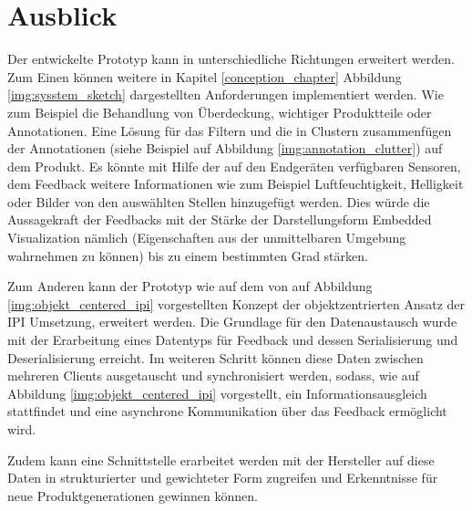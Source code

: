 \section{Ausblick}

Der entwickelte Prototyp kann in unterschiedliche Richtungen erweitert werden. Zum Einen können weitere in Kapitel \ref{conception_chapter} Abbildung \ref{img:sysstem_sketch} dargestellten Anforderungen implementiert 
werden. Wie zum Beispiel die Behandlung von Überdeckung, wichtiger Produktteile oder Annotationen. Eine Lösung für das Filtern und die in Clustern zusammenfügen der Annotationen (siehe Beispiel auf Abbildung \ref{img:annotation_clutter}) auf dem Produkt. Es könnte mit Hilfe der auf den Endgeräten verfügbaren Sensoren, dem Feedback weitere Informationen wie zum Beispiel Luftfeuchtigkeit, Helligkeit oder Bilder von den auswählten Stellen hinzugefügt werden. Dies würde die Aussagekraft der Feedbacks mit der Stärke der Darstellungsform Embedded Visualization nämlich (Eigenschaften aus der unmittelbaren Umgebung wahrnehmen zu können) bis zu einem bestimmten Grad stärken. 

Zum Anderen kann der Prototyp wie auf dem von \citeauthor{Kirschner2012} auf Abbildung \ref{img:objekt_centered_ipi} vorgestellten Konzept der objektzentrierten Ansatz der IPI Umsetzung, erweitert werden.
Die Grundlage für den Datenaustausch wurde mit der Erarbeitung eines Datentyps für Feedback und dessen Serialisierung und Deserialisierung erreicht. Im weiteren Schritt können diese Daten zwischen mehreren
Clients ausgetauscht und synchronisiert werden, sodass, wie auf Abbildung \ref{img:objekt_centered_ipi} vorgestellt, ein Informationsausgleich stattfindet und eine asynchrone Kommunikation über das Feedback ermöglicht wird. 

Zudem kann eine Schnittstelle erarbeitet werden mit der Hersteller auf diese Daten in strukturierter und gewichteter Form zugreifen und Erkenntnisse für neue Produktgenerationen gewinnen können.  




